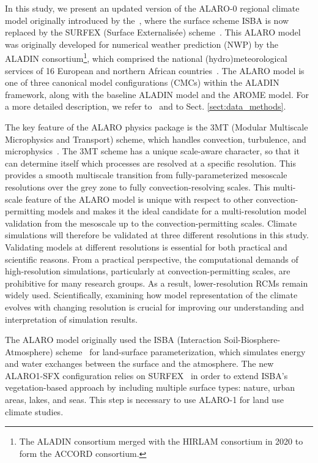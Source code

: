 \documentclass[journal abbreviation, manuscript]{copernicus}
\begin{document}
In this study, we present an updated version of the ALARO-0 regional climate model originally introduced by the~\citet{de_troch_multiscale_2013}, where the surface scheme ISBA is now replaced by the SURFEX (Surface Externalisée) scheme~\citep{hamdi_evaluating_2014}. 
This ALARO model was originally developed for numerical weather prediction (NWP) by the ALADIN consortium\footnote{The ALADIN consortium merged with the HIRLAM consortium in 2020 to form the ACCORD consortium.}, which comprised the national (hydro)meteorological services of 16 European and northern African countries~\citep{termonia_aladin_2018}.
The ALARO model is one of three canonical model configurations (CMCs) within the ALADIN framework, along with the baseline ALADIN model and the AROME model.
For a more detailed description, we refer to~\citet{termonia_aladin_2018} and to Sect. \ref{sect:data_methods}.

The key feature of the ALARO physics package is the 3MT (Modular Multiscale Microphysics and Transport) scheme, which handles convection, turbulence, and microphysics~\citep{gerard_evolution_2005, gerard_integrated_2007, gerard_cloud_2009}.
The 3MT scheme has a unique scale-aware character, so that it can determine itself which processes are resolved at a specific resolution.
This provides a smooth multiscale transition from fully-parameterized mesoscale resolutions over the grey zone to fully convection-resolving scales.
This multi-scale feature of the ALARO model is unique with respect to other convection-permitting models and makes it the ideal candidate for a multi-resolution model validation from the mesoscale up to the convection-permitting scales.
Climate simulations will therefore be validated at three different resolutions in this study.
Validating models at different resolutions is essential for both practical and scientific reasons. 
From a practical perspective, the computational demands of high-resolution simulations, particularly at convection-permitting scales, are prohibitive for many research groups. 
As a result, lower-resolution RCMs remain widely used.
Scientifically, examining how model representation of the climate evolves with changing resolution is crucial for improving our understanding and interpretation of simulation results.

The ALARO model originally used the ISBA (Interaction Soil-Biosphere-Atmosphere) scheme~\citep{noilhan_simple_1989, noilhan_isba_1996} for land-surface parameterization, which simulates energy and water exchanges between the surface and the atmosphere.
The new ALARO1-SFX configuration relies on SURFEX~\citep{masson_surfexv72_2013} in order to extend ISBA’s vegetation-based approach by including multiple surface types: nature, urban areas, lakes, and seas. 
This step is necessary to use ALARO-1 for land use climate studies.
\end{document}

